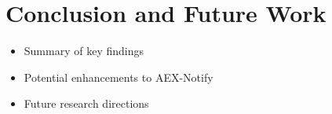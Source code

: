 \documentclass{llncs}
\begin{document}
\section{Conclusion and Future Work}
\begin{itemize}
    \item Summary of key findings
    \item Potential enhancements to AEX-Notify
    \item Future research directions
\end{itemize}


%

\end{document}
